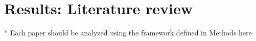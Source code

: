 \section{Results: Literature review}
* Each paper should be analyzed using the framework defined in Methods here